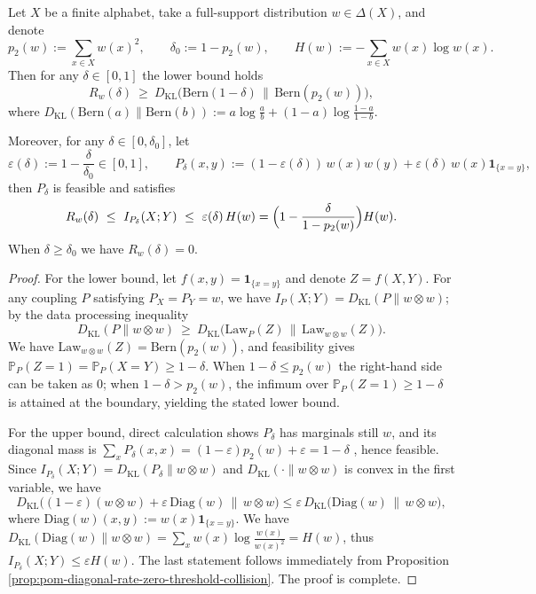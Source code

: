 \begin{theorem}\label{thm:pom-diagonal-rate-bernoulli-lower-and-mixture-upper}
Let \(X\) be a finite alphabet, take a full-support distribution \(w\in\Delta(X)\), and denote
\[
p_2(w):=\sum_{x\in X}w(x)^2,\qquad \delta_0:=1-p_2(w),\qquad H(w):=-\sum_{x\in X}w(x)\log w(x).
\]
Then for any \(\delta\in[0,1]\) the lower bound holds
\[
R_w(\delta)\ \ge\ D_{\mathrm{KL}}\!\bigl(\mathrm{Bern}(1-\delta)\,\|\,\mathrm{Bern}(p_2(w))\bigr),
\]
where \(D_{\mathrm{KL}}(\mathrm{Bern}(a)\|\mathrm{Bern}(b)):=a\log\frac{a}{b}+(1-a)\log\frac{1-a}{1-b}\).
\par
Moreover, for any \(\delta\in[0,\delta_0]\), let
\[
\varepsilon(\delta):=1-\frac{\delta}{\delta_0}\in[0,1],\qquad
P_\delta(x,y):=(1-\varepsilon(\delta))\,w(x)w(y)+\varepsilon(\delta)\,w(x)\mathbf 1_{\{x=y\}},
\]
then \(P_\delta\) is feasible and satisfies
\[
R_w(\delta)\ \le\ I_{P_\delta}(X;Y)\ \le\ \varepsilon(\delta)\,H(w)
=\Bigl(1-\frac{\delta}{1-p_2(w)}\Bigr)H(w).
\]
When \(\delta\ge\delta_0\) we have \(R_w(\delta)=0\).
\end{theorem}
\begin{proof}
For the lower bound, let \(f(x,y)=\mathbf 1_{\{x=y\}}\) and denote \(Z=f(X,Y)\).
For any coupling \(P\) satisfying \(P_X=P_Y=w\), we have
\(
I_P(X;Y)=D_{\mathrm{KL}}(P\|w\otimes w)
\);
by the data processing inequality
\[
D_{\mathrm{KL}}(P\|w\otimes w)\ \ge\ D_{\mathrm{KL}}\!\bigl(\mathrm{Law}_P(Z)\,\|\,\mathrm{Law}_{w\otimes w}(Z)\bigr).
\]
We have \(\mathrm{Law}_{w\otimes w}(Z)=\mathrm{Bern}(p_2(w))\), and feasibility gives \(\mathbb P_P(Z=1)=\mathbb P_P(X=Y)\ge 1-\delta\).
When \(1-\delta\le p_2(w)\) the right-hand side can be taken as \(0\); when \(1-\delta>p_2(w)\), the infimum over \(\mathbb P_P(Z=1)\ge 1-\delta\) is attained at the boundary, yielding the stated lower bound.
\par
For the upper bound, direct calculation shows \(P_\delta\) has marginals still \(w\), and its diagonal mass is
\(
\sum_x P_\delta(x,x)=(1-\varepsilon)p_2(w)+\varepsilon=1-\delta
\)
, hence feasible.
Since
\(
I_{P_\delta}(X;Y)=D_{\mathrm{KL}}(P_\delta\|w\otimes w)
\)
and \(D_{\mathrm{KL}}(\cdot\|w\otimes w)\) is convex in the first variable, we have
\[
D_{\mathrm{KL}}\!\bigl((1-\varepsilon)(w\otimes w)+\varepsilon\,\mathrm{Diag}(w)\,\big\|\,w\otimes w\bigr)
\le \varepsilon\,D_{\mathrm{KL}}\!\bigl(\mathrm{Diag}(w)\,\|\,w\otimes w\bigr),
\]
where \(\mathrm{Diag}(w)(x,y):=w(x)\mathbf 1_{\{x=y\}}\).
We have
\(
D_{\mathrm{KL}}(\mathrm{Diag}(w)\|w\otimes w)=\sum_x w(x)\log\frac{w(x)}{w(x)^2}=H(w)
\),
thus \(I_{P_\delta}(X;Y)\le \varepsilon H(w)\).
The last statement follows immediately from Proposition \ref{prop:pom-diagonal-rate-zero-threshold-collision}. The proof is complete.
\end{proof}

